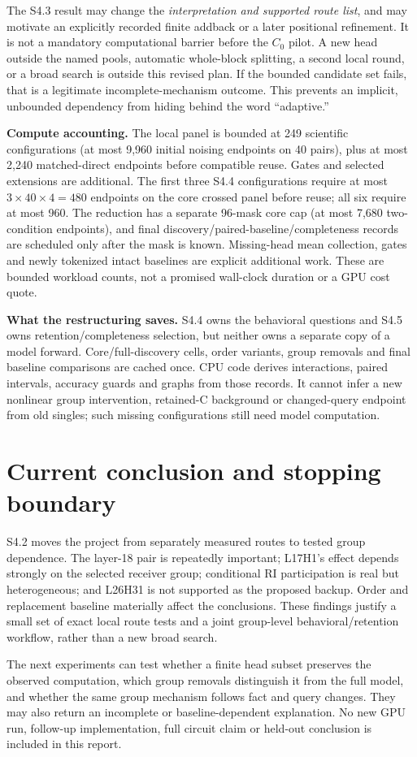 The S4.3 result may change the \emph{interpretation and supported route list}, and may motivate an explicitly recorded finite addback or a later positional refinement. It is not a mandatory computational barrier before the $C_0$ pilot. A new head outside the named pools, automatic whole-block splitting, a second local round, or a broad search is outside this revised plan. If the bounded candidate set fails, that is a legitimate incomplete-mechanism outcome. This prevents an implicit, unbounded dependency from hiding behind the word ``adaptive.''

\textbf{Compute accounting.} The local panel is bounded at 249 scientific configurations (at most 9,960 initial noising endpoints on 40 pairs), plus at most 2,240 matched-direct endpoints before compatible reuse. Gates and selected extensions are additional. The first three S4.4 configurations require at most $3\times40\times4=480$ endpoints on the core crossed panel before reuse; all six require at most 960. The reduction has a separate 96-mask core cap (at most 7,680 two-condition endpoints), and final discovery/paired-baseline/completeness records are scheduled only after the mask is known. Missing-head mean collection, gates and newly tokenized intact baselines are explicit additional work. These are bounded workload counts, not a promised wall-clock duration or a GPU cost quote.

\textbf{What the restructuring saves.} S4.4 owns the behavioral questions and S4.5 owns retention/completeness selection, but neither owns a separate copy of a model forward. Core/full-discovery cells, order variants, group removals and final baseline comparisons are cached once. CPU code derives interactions, paired intervals, accuracy guards and graphs from those records. It cannot infer a new nonlinear group intervention, retained-C background or changed-query endpoint from old singles; such missing configurations still need model computation.
\FloatBarrier

\section{Current conclusion and stopping boundary}
S4.2 moves the project from separately measured routes to tested group dependence. The layer-18 pair is repeatedly important; L17H1's effect depends strongly on the selected receiver group; conditional RI participation is real but heterogeneous; and L26H31 is not supported as the proposed backup. Order and replacement baseline materially affect the conclusions. These findings justify a small set of exact local route tests and a joint group-level behavioral/retention workflow, rather than a new broad search.

The next experiments can test whether a finite head subset preserves the observed computation, which group removals distinguish it from the full model, and whether the same group mechanism follows fact and query changes. They may also return an incomplete or baseline-dependent explanation. No new GPU run, follow-up implementation, full circuit claim or held-out conclusion is included in this report.

